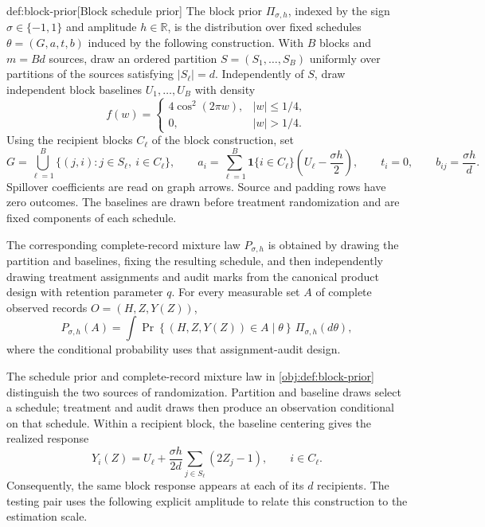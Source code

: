 \begin{definitionv}{def:block-prior}[Block schedule prior]
The block prior \(\Pi_{\sigma,h}\), indexed by the sign \(\sigma\in\{-1,1\}\) and amplitude \(h\in\mathbb R\), is the distribution over fixed schedules \(\theta=(G,a,t,b)\) induced by the following construction. With \(B\) blocks and \(m=Bd\) sources, draw an ordered partition \(S=(S_1,\ldots,S_B)\) uniformly over partitions of the sources satisfying \(|S_\ell|=d\). Independently of \(S\), draw independent block baselines \(U_1,\ldots,U_B\) with density
\[
f(w)=
\begin{cases}
4\cos^2(2\pi w),& |w|\le 1/4,\\
0,& |w|>1/4.
\end{cases}
\]
Using the recipient blocks \(C_\ell\) of the block construction, set
\[
G=\bigcup_{\ell=1}^{B}\{(j,i):j\in S_\ell,\ i\in C_\ell\},
\qquad
a_i=\sum_{\ell=1}^{B}\mathbf1\{i\in C_\ell\}
       \left(U_\ell-\frac{\sigma h}{2}\right),
\qquad
t_i=0,
\qquad
b_{ij}=\frac{\sigma h}{d}.
\]
Spillover coefficients are read on graph arrows. Source and padding rows have zero outcomes. The baselines are drawn before treatment randomization and are fixed components of each schedule.

The corresponding complete-record mixture law \(P_{\sigma,h}\) is obtained by drawing the partition and baselines, fixing the resulting schedule, and then independently drawing treatment assignments and audit marks from the canonical product design with retention parameter \(q\). For every measurable set \(A\) of complete observed records \(O=(H,Z,Y(Z))\),
\[
P_{\sigma,h}(A)
=
\int
\Pr\!\left\{(H,Z,Y(Z))\in A\mid\theta\right\}
\,\Pi_{\sigma,h}(d\theta),
\]
where the conditional probability uses that assignment-audit design.
\end{definitionv}

The schedule prior  and complete-record mixture law  in \cref{obj:def:block-prior} distinguish the two sources of randomization. Partition and baseline draws select a schedule; treatment and audit draws then produce an observation conditional on that schedule. Within a recipient block, the baseline centering gives the realized response
\[
Y_i(Z)
=
U_\ell+\frac{\sigma h}{2d}\sum_{j\in S_\ell}(2Z_j-1),
\qquad i\in C_\ell.
\]
Consequently, the same block response appears at each of its \(d\) recipients. The testing pair uses the following explicit amplitude to relate this construction to the estimation scale.

